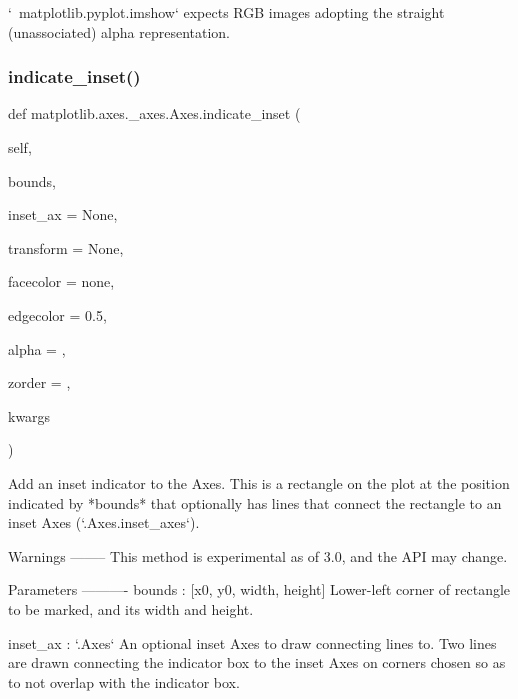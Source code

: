 \begin{DoxyVerb}
\begin{DoxyVerb}
`~matplotlib.pyplot.imshow` expects RGB images adopting the straight
(unassociated) alpha representation.
\end{DoxyVerb}
 \mbox{\label{classmatplotlib_1_1axes_1_1__axes_1_1Axes_ac467617ba416b91463837b2963cdc605}} 
\subsubsection{\texorpdfstring{indicate\+\_\+inset()}{indicate\_inset()}}
{\footnotesize\ttfamily def matplotlib.\+axes.\+\_\+axes.\+Axes.\+indicate\+\_\+inset (\begin{DoxyParamCaption}\item[{}]{self,  }\item[{}]{bounds,  }\item[{}]{inset\+\_\+ax = {\ttfamily None},  }\item[{}]{transform = {\ttfamily None},  }\item[{}]{facecolor = {\ttfamily \textquotesingle{}none\textquotesingle{}},  }\item[{}]{edgecolor = {\ttfamily \textquotesingle{}0.5\textquotesingle{}},  }\item[{}]{alpha = {},  }\item[{}]{zorder = {},  }\item[{}]{kwargs }\end{DoxyParamCaption})}

\begin{DoxyVerb}Add an inset indicator to the Axes.  This is a rectangle on the plot
at the position indicated by *bounds* that optionally has lines that
connect the rectangle to an inset Axes (`.Axes.inset_axes`).

Warnings
--------
This method is experimental as of 3.0, and the API may change.

Parameters
----------
bounds : [x0, y0, width, height]
    Lower-left corner of rectangle to be marked, and its width
    and height.

inset_ax : `.Axes`
    An optional inset Axes to draw connecting lines to.  Two lines are
    drawn connecting the indicator box to the inset Axes on corners
    chosen so as to not overlap with the indicator box.


\end{DoxyVerb}
\end{DoxyVerb}
